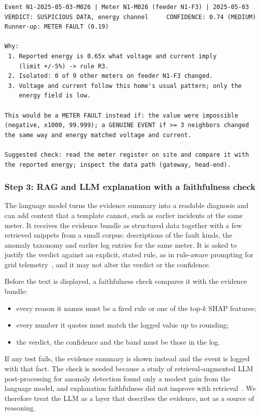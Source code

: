\documentclass[11pt,a4paper]{article}
\begin{document}
\begin{lstlisting}
Event N1-2025-05-03-M026 | Meter N1-M026 (feeder N1-F3) | 2025-05-03
VERDICT: SUSPICIOUS DATA, energy channel     CONFIDENCE: 0.74 (MEDIUM)
Runner-up: METER FAULT (0.19)

Why:
 1. Reported energy is 0.65x what voltage and current imply
    (limit +/-5%) -> rule R3.
 2. Isolated: 0 of 9 other meters on feeder N1-F3 changed.
 3. Voltage and current follow this home's usual pattern; only the
    energy field is low.

This would be a METER FAULT instead if: the value were impossible
(negative, x1000, 99.999); a GENUINE EVENT if >= 3 neighbors changed
the same way and energy matched voltage and current.

Suggested check: read the meter register on site and compare it with
the reported energy; inspect the data path (gateway, head-end).
\end{lstlisting}

\subsubsection*{Step 3: RAG and LLM explanation with a faithfulness check}
The language model turns the evidence summary into a readable diagnosis and can add context that a
template cannot, such as earlier incidents at the same meter. It receives the evidence bundle as structured
data together with a few retrieved snippets from a small corpus: descriptions of the fault kinds, the
anomaly taxonomy and earlier log entries for the same meter. It is asked to justify the verdict against an
explicit, stated rule, as in rule-aware prompting for grid telemetry~\cite{ruleaware}, and it may not alter
the verdict or the confidence.

Before the text is displayed, a faithfulness check compares it with the evidence bundle:
\begin{itemize}[leftmargin=*,itemsep=1pt]
  \item every reason it names must be a fired rule or one of the top-$k$ SHAP features;
  \item every number it quotes must match the logged value up to rounding;
  \item the verdict, the confidence and the band must be those in the log.
\end{itemize}
If any test fails, the evidence summary is shown instead and the event is logged with that fact. The check
is needed because a study of retrieval-augmented LLM post-processing for anomaly detection found only a
modest gain from the language model, and explanation faithfulness did not improve with retrieval~\cite{ragaudit}.
We therefore treat the LLM as a layer that describes the evidence, not as a source of reasoning.
\end{document}
